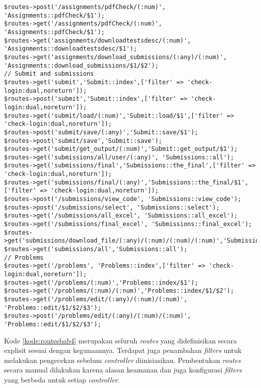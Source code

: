 \begin{lstlisting}[caption=Penambahan \textit{routes} yang digunakan pada aplikasi \textit{SharIF Judge}, label=kode:routesbab4]
$routes->post('/assignments/pdfCheck/(:num)', 'Assignments::pdfCheck/$1');
$routes->get('/assignments/pdfCheck/(:num)', 'Assignments::pdfCheck/$1');
$routes->get('assignments/downloadtestsdesc/(:num)', 'Assignments::downloadtestsdesc/$1');
$routes->get('assignments/download_submissions/(:any)/(:num)', 'Assignments::download_submissions/$1/$2');
// Submit and submissions
$routes->get('submit','Submit::index',['filter' => 'check-login:dual,noreturn']);
$routes->post('submit','Submit::index',['filter' => 'check-login:dual,noreturn']);
$routes->get('submit/load/(:num)','Submit::load/$1',['filter' => 'check-login:dual,noreturn']);
$routes->post('submit/save/(:any)','Submit::save/$1');
$routes->post('submit/save','Submit::save');
$routes->get('submit/get_output/(:num)','Submit::get_output/$1');
$routes->get('submissions/all/user/(:any)', 'Submissions::all');
$routes->get('submissions/final','Submissions::the_final',['filter' => 'check-login:dual,noreturn']);
$routes->get('submissions/final/(:any)','Submissions::the_final/$1',['filter' => 'check-login:dual,noreturn']);
$routes->post('/submissions/view_code', 'Submissions::view_code');
$routes->post('/submissions/select', 'Submissions::select');
$routes->get('/submissions/all_excel', 'Submissions::all_excel');
$routes->get('/submissions/final_excel', 'Submissions::final_excel');
$routes->get('submissions/download_file/(:any)/(:num)/(:num)/(:num)','Submissions::download_file/$1/$2/$3/$4');
$routes->get('submissions/all','Submissions::all');
// Problems
$routes->get('/problems', 'Problems::index',['filter' => 'check-login:dual,noreturn']);
$routes->get('/problems/(:num)','Problems::index/$1');
$routes->get('/problems/(:num)/(:num)','Problems::index/$1/$2');
$routes->get('/problems/edit/(:any)/(:num)/(:num)', 'Problems::edit/$1/$2/$3');
$routes->post('/problems/edit/(:any)/(:num)/(:num)', 'Problems::edit/$1/$2/$3');
\end{lstlisting}
Kode \ref{kode:routesbab4} merupakan seluruh \textit{routes} yang didefinisikan secara explisit sesuai dengan kegunaannya. Terdapat juga penambahan \textit{filters} untuk melakukan pengecekan sebelum \textit{controller} diinisiasikan. Pembentukan \textit{routes} secara manual dilakukan karena alasan keamanan dan juga konfigurasi \textit{filters} yang berbeda untuk setiap \textit{controller}.

